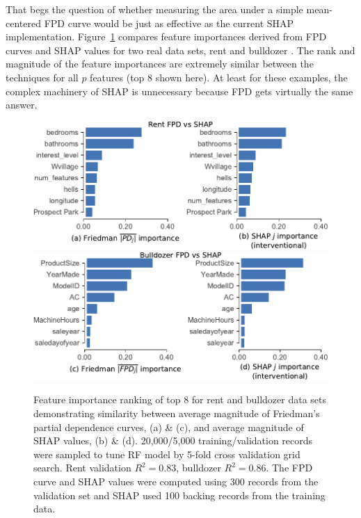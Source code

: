 \documentclass[11pt]{article}
\newcommand{\figref}[1]{Figure~\ref{#1}}
\begin{document}
That begs the question of whether measuring the area under a simple mean-centered FPD curve would be just as effective as the current SHAP implementation.  \figref{fig:fpd_imp} compares feature importances derived from FPD curves and SHAP values for two real data sets, rent \cite{rent} and bulldozer \cite{bulldozer}. The rank and magnitude of the feature importances are extremely similar between the techniques for all $p$ features (top 8 shown here). At least for these examples, the complex machinery of SHAP is unnecessary because FPD gets virtually the same answer. 

\begin{figure}[htbp]
\begin{center}
\includegraphics[scale=0.53]{images/rent-pdp-vs-shap.pdf}\includegraphics[scale=0.53]{images/bulldozer-pdp-vs-shap.pdf}
\caption[short]{\small  Feature importance ranking of top 8 for rent and bulldozer data sets demonstrating similarity between average magnitude of Friedman's partial dependence curves, (a) \& (c), and average magnitude of SHAP values, (b) \& (d). 20,000/5,000 training/validation records were sampled to tune RF model by 5-fold cross validation grid search. Rent validation $R^2 = 0.83$, bulldozer $R^2 = 0.86$. The FPD curve and SHAP values were computed using 300 records from the validation set and SHAP used 100 backing records from the training data.}
\label{fig:fpd_imp}
\end{center}
\end{figure}
\end{document}
